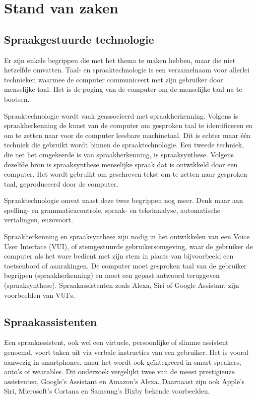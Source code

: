 \chapter{Stand van zaken}
\label{ch:stand-van-zaken}
\section{Spraakgestuurde technologie}
Er zijn enkele begrippen die met het thema te maken hebben, maar die niet hetzelfde omvatten. Taal- en spraaktechnologie is een verzamelnaam voor allerlei technieken waarmee de computer communiceert met zijn gebruiker door menselijke taal.\autocite{Taalunie2017} Het is de poging van de computer om de menselijke taal na te bootsen.

Spraaktechnologie wordt vaak geassocieerd met spraakherkenning. Volgens \autocite{Rouse2016} is spraakherkenning de kunst van de computer om gesproken taal te identificeren en om te zetten naar voor de computer leesbare machinetaal. Dit is echter maar één techniek die gebruikt wordt binnen de spraaktechnologie. Een tweede techniek, die net het omgekeerde is van spraakherkenning, is spraaksynthese. Volgens dezelfde bron is spraaksynthese menselijke spraak dat is ontwikkeld door een computer. Het wordt gebruikt om geschreven tekst om te zetten naar gesproken taal, geproduceerd door de computer.

Spraaktechnologie omvat naast deze twee begrippen nog meer. Denk maar aan spelling- en grammaticacontrole, spraak- en tekstanalyse, automatische vertalingen, enzovoort.

Spraakherkenning en spraaksynthese zijn nodig in het ontwikkelen van een Voice User Interface (VUI), of stemgestuurde gebruikersomgeving, waar de gebruiker de computer als het ware bedient met zijn stem in plaats van bijvoorbeeld een toetsenbord of aanrakingen. De computer moet gesproken taal van de gebruiker begrijpen (spraakherkenning) en moet een gepast antwoord teruggeven (spraaksynthese). Spraakassistenten zoals Alexa, Siri of Google Assistant zijn voorbeelden van VUI's.

\section{Spraakassistenten}
Een spraakassistent, ook wel een virtuele, persoonlijke of slimme assistent genoemd, voert taken uit via verbale instructies van een gebruiker. Het is vooral aanwezig in smartphones, maar het wordt ook geïntegreerd in smart speakers, auto's of wearables. Dit onderzoek vergelijkt twee van de meest prestigieuze assistenten, Google’s Assistant en Amazon’s Alexa. Daarnaast zijn ook Apple's Siri, Microsoft's Cortana en Samsung's Bixby bekende voorbeelden.

